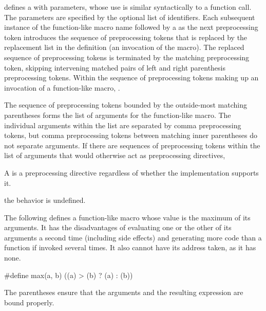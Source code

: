 \documentclass{wg21}
\begin{document}
defines a 
with parameters, whose use is
similar syntactically to a function call.
The parameters
%
are specified by the optional list of identifiers.
Each subsequent instance of the function-like macro name followed by a
\tcode{(}
as the next preprocessing token
introduces the sequence of preprocessing tokens that is replaced
by the replacement list in the definition
(an invocation of the macro).
%
The replaced sequence of preprocessing tokens is terminated by the matching
\tcode{)}
preprocessing token, skipping intervening matched pairs of left and
right parenthesis preprocessing tokens.
Within the sequence of preprocessing tokens making up an invocation
of a function-like macro,
.

\pnum
{}%
The sequence of preprocessing tokens
bounded by the outside-most matching parentheses
forms the list of arguments for the function-like macro.
The individual arguments within the list
are separated by comma preprocessing tokens,
but comma preprocessing tokens between matching
inner parentheses do not separate arguments.
If there are sequences of preprocessing tokens within the list of
arguments that would otherwise act as preprocessing directives,
\begin{footnote}
    A  is a preprocessing directive regardless of whether the implementation supports it.
\end{footnote}
the behavior is undefined.

\pnum
\begin{example}
    The following defines a function-like
    macro whose value is the maximum of its arguments.
    It has the disadvantages of evaluating one or the other of its arguments
    a second time
    (including
    side effects)
    and generating more code than a function if invoked several times.
    It also cannot have its address taken,
    as it has none.
    
    \begin{codeblock}
        #define max(a, b) ((a) > (b) ? (a) : (b))
    \end{codeblock}
    
    The parentheses ensure that the arguments and
    the resulting expression are bound properly.
\end{example}
\end{document}
